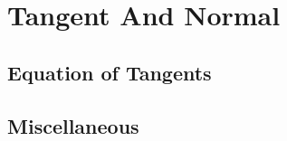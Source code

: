 \documentclass[11pt]{book}
\begin{document}
\chapter{Tangent And Normal}
\section{Equation of Tangents}

\section{Miscellaneous}


%
%
%
%
%
%
%
\end{document}
